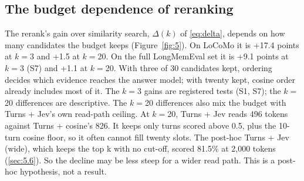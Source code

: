 \documentclass[11pt]{article}
\newcommand{\src}[1]{}
\begin{document}
\subsection{The budget dependence of reranking}\label{sec:5.3}
The rerank's gain over similarity search, $\Delta(k)$ of \cref{eq:delta}, depends on how many candidates the budget keeps (Figure~\ref{fig:5}). On LoCoMo it is +17.4\src{bench/results/v3/batch\_a\_report.json\#fresh (T0R k3 - L0 k3)} points at $k{=}$3 and +1.5\src{bench/results/v3/batch\_a\_report.json\#fresh (T0R k20 - L0 k20)} at $k{=}$20. On the full LongMemEval set it is +9.1\src{bench/results/v3/batch\_c\_report.json\#expansion (T0R 3 - L0 3)} points at $k{=}$3 (S7) and +1.1\src{bench/results/v3/batch\_c\_report.json\#expansion (T0R 20 - L0 20)} at $k{=}$20. With three of 30\src{docs/V3\_PLAN.md §1, §2, §4} candidates kept, ordering decides which evidence reaches the answer model; with twenty kept, cosine order already includes most of it. The $k{=}$3 gains are registered tests (S1, S7); the $k{=}$20 differences are descriptive. The $k{=}$20 differences also mix the budget with Turns + Jev's own read-path ceiling. At $k{=}$20, Turns + Jev reads 496\src{bench/results/v3/batch\_a\_report.json\#fresh/T0R k20/tokens\_mean} tokens against Turns + cosine's 826\src{bench/results/v3/batch\_a\_report.json\#fresh/L0 k20/tokens\_mean}. It keeps only turns scored above 0.5\src{docs/V3\_PLAN.md §1, §2, §4}, plus the 10\src{docs/V3\_PLAN.md §1, §2, §4}-turn cosine floor, so it often cannot fill twenty slots. The post-hoc Turns + Jev (wide), which keeps the top k with no cut-off, scored 81.5\%\src{bench/results/v3\_posthoc/report.json\#comparison/T0R-wide 47 (POST-HOC EXPLORATORY (T0R-wide; docs/V3\_PLAN.md §12))/accuracy} at 2,000\src{bench/results/v3\_posthoc/report.json\#comparison/T0R-wide 47 (POST-HOC EXPLORATORY (T0R-wide; docs/V3\_PLAN.md §12))/tokens\_mean} tokens (\cref{sec:5.6}). So the decline may be less steep for a wider read path. This is a post-hoc hypothesis, not a result.
\end{document}
